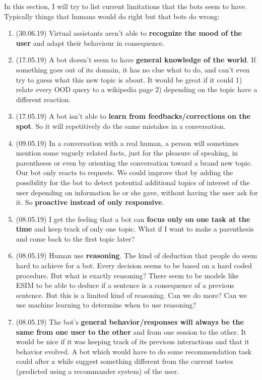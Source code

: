 \documentclass[11pt,a4paper]{article}
\begin{document}
In this section, I will try to list current limitations that the bots seem to have. Typically things that humans would do right but that bots do wrong:
\begin{enumerate}
\item (30.06.19) Virtual assistants aren't able to \textbf{recognize the mood of the user} and adapt their behaviour in consequence.
\item (17.05.19) A bot doesn't seem to have \textbf{general knowledge of the world}. If something goes out of its domain, it has no clue what to do, and can't even try to guess what this new topic is about. It would be great if it could 1) relate every OOD query to a wikipedia page 2) depending on the topic have a different reaction.
\item (17.05.19) A bot isn't able to \textbf{learn from feedbacks/corrections on the spot}. So it will repetitively do the same mistakes in a conversation.
\item (09.05.19) In a conversation with a real human, a person will sometimes mention some vaguely related facts, just for the pleasure of speaking, in parentheses or even by orienting the conversation toward a brand new topic. Our bot only reacts to requests. We could improve that by adding the possibility for the bot to detect potential additional topics of interest of the user depending on information he or she gave, without having the user ask for it. So \textbf{proactive instead of only responsive}.
\item (08.05.19) I get the feeling that a bot can \textbf{focus only on one task at the time} and keep track of only one topic. What if I want to make a parenthesis and come back to the first topic later?
\item (08.05.19) Human use \textbf{reasoning}. The kind of deduction that people do seem hard to achieve for a bot. Every decision seems to be based on a hard coded procedure. But what is exactly reasoning? There seem to be models like ESIM to be able to deduce if a sentence is a consequence of a previous sentence. But this is a limited kind of reasoning. Can we do more? Can we use machine learning to determine when to use reasoning?
\item (08.05.19) The bot's \textbf{general behavior/responses will always be the same from one user to the other} and from one session to the other. It would be nice if it was keeping track of its previous interactions and that it behavior evolved. A bot which would have to do some recommendation task could after a while suggest something different from the current tastes (predicted using a recommander system) of the user.

\end{enumerate}
\end{document}
